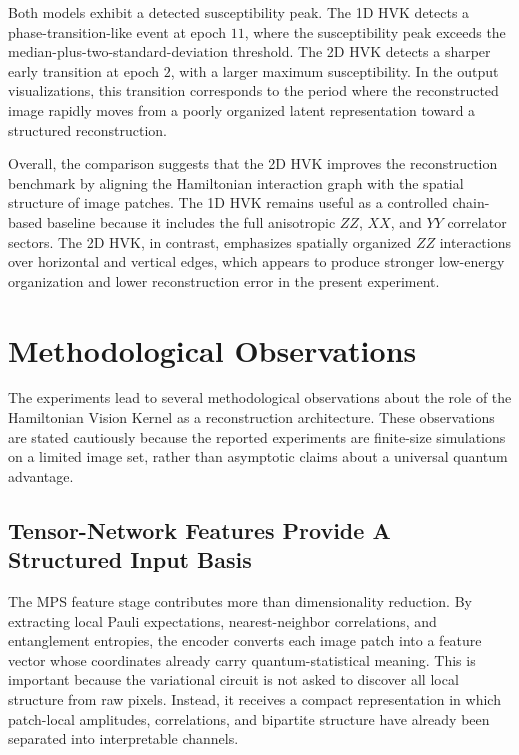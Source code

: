 \documentclass[11pt]{article}
\begin{document}
Both models exhibit a detected susceptibility peak. The 1D HVK detects a phase-transition-like event at epoch $11$, where the susceptibility peak exceeds the median-plus-two-standard-deviation threshold. The 2D HVK detects a sharper early transition at epoch $2$, with a larger maximum susceptibility. In the output visualizations, this transition corresponds to the period where the reconstructed image rapidly moves from a poorly organized latent representation toward a structured reconstruction.

Overall, the comparison suggests that the 2D HVK improves the reconstruction benchmark by aligning the Hamiltonian interaction graph with the spatial structure of image patches. The 1D HVK remains useful as a controlled chain-based baseline because it includes the full anisotropic $ZZ$, $XX$, and $YY$ correlator sectors. The 2D HVK, in contrast, emphasizes spatially organized $ZZ$ interactions over horizontal and vertical edges, which appears to produce stronger low-energy organization and lower reconstruction error in the present experiment.

\section{Methodological Observations}

The experiments lead to several methodological observations about the role of the Hamiltonian Vision Kernel as a reconstruction architecture. These observations are stated cautiously because the reported experiments are finite-size simulations on a limited image set, rather than asymptotic claims about a universal quantum advantage.

\subsection{Tensor-Network Features Provide A Structured Input Basis}

The MPS feature stage contributes more than dimensionality reduction. By extracting local Pauli expectations, nearest-neighbor correlations, and entanglement entropies, the encoder converts each image patch into a feature vector whose coordinates already carry quantum-statistical meaning. This is important because the variational circuit is not asked to discover all local structure from raw pixels. Instead, it receives a compact representation in which patch-local amplitudes, correlations, and bipartite structure have already been separated into interpretable channels.
\end{document}
